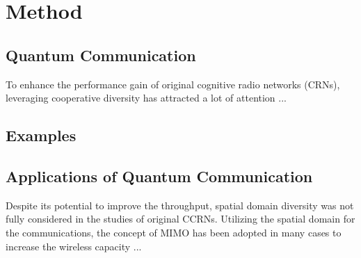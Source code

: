 \documentclass[master,english,final]{kaist-ucs} %
\begin{document}














\chapter[Method]{Method}
\label{ch:ourmethod}
\section{Quantum Communication}
To enhance the performance gain of original cognitive radio networks (CRNs),
leveraging cooperative diversity has attracted a lot of attention
\cite{SOCA1}...

\section{Examples}

\section{Applications of Quantum Communication}
\label{ch:application}
\noindent
Despite its potential to improve the throughput, spatial domain diversity was not fully considered in the studies of original CCRNs. Utilizing the spatial domain for the communications, the concept of MIMO has been adopted in many cases to increase the wireless capacity \cite{EF1,FD2}...
\end{document}
